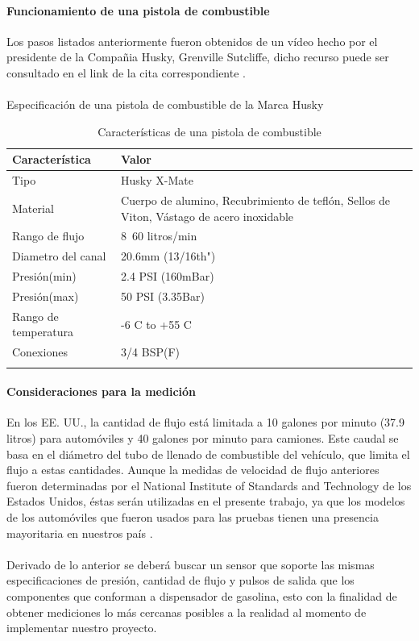 \paragraph{Funcionamiento de una pistola de combustible}
Los pasos listados anteriormente fueron obtenidos de un vídeo hecho por el presidente de la Compañia Husky, Grenville Sutcliffe, dicho recurso puede ser consultado en el link de la cita correspondiente \citep{MarcoTeorico8}.
\paragraph{}
Especificación de una pistola de combustible de la Marca Husky
\begin{longtable}{|M{7cm}|M{7.5cm}|}
	\hline
	\textbf{Característica} & \textbf{Valor}
	\\\hline
	Tipo & Husky X-Mate
	\\\hline
	Material & Cuerpo de alumino, Recubrimiento de teflón, Sellos de Viton,
	Vástago de acero inoxidable
	\\\hline
	Rango de flujo & 8~60 litros/min
	\\\hline
	Diametro del canal & 20.6mm (13/16th")
	\\\hline
	Presión(min) & 2.4 PSI (160mBar)
	\\\hline
	Presión(max) & 50 PSI (3.35Bar)
	\\\hline
	Rango de temperatura & -6 C to +55 C
	\\\hline
	Conexiones & 3/4 BSP(F)
	\\\hline
	\caption{Características de una pistola de combustible}
	\label{tabla_pistola_combustible} 
\end{longtable}

\paragraph{Consideraciones para la medición}
En los EE. UU., la cantidad de flujo está limitada a 10 galones por minuto (37.9 litros) para automóviles y 40 galones por minuto para camiones. Este caudal se basa en el diámetro del tubo de llenado de combustible del vehículo, que limita el flujo a estas cantidades. Aunque la medidas de velocidad de flujo anteriores fueron determinadas por el National Institute of Standards and Technology de los Estados Unidos, éstas serán utilizadas en el presente trabajo, ya que los modelos de los automóviles que fueron usados para las pruebas tienen una presencia mayoritaria en nuestros país \citep{MarcoTeorico7}.
\paragraph{}
Derivado de lo anterior se deberá buscar un sensor que soporte las mismas especificaciones de presión, cantidad de flujo y pulsos de salida que los componentes que conforman a dispensador de gasolina, esto con la finalidad de obtener mediciones lo más cercanas posibles a la realidad al momento de implementar nuestro proyecto.
